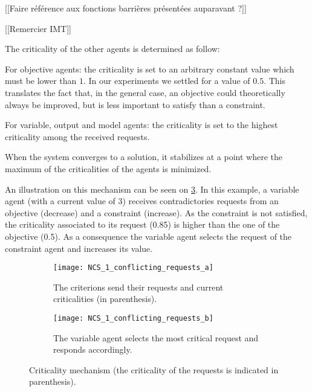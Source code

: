 [[Faire référence aux fonctions barrières présentées auparavant ?]]

[[Remercier IMT]]

\noindent The criticality of the other agents is determined as follow:

\begin{compactitem}
\item For objective agents: the criticality is set to an arbitrary constant value which must be lower than \(1\). In our experiments we settled for a value of \(0.5\). This translates the fact that, in the general case, an objective could theoretically always be improved, but is less important to satisfy than a constraint.
\item For variable, output and model agents: the criticality is set to the highest criticality among the received requests.
\end{compactitem}

When the system converges to a solution, it stabilizes at a point where the maximum of the criticalities of the agents is minimized.

An illustration on this mechanism can be seen on \figurename{} \ref{NCS_1_conflicting_requests}. In this example, a variable agent (with a current value of 3) receives contradictories requests from an objective (decrease) and a constraint (increase). As the constraint is not satisfied, the criticality associated to its request (0.85) is higher than the one of the objective (0.5). As a consequence the variable agent selects the request of the constraint agent and increases its value.

\begin{figure}
	\centering
	\begin{subfigure}[b]{0.45\textwidth}
		\centering
		\texttt{[image: NCS\_1\_conflicting\_requests\_a]}
		\caption{The criterions send their requests and current criticalities (in parenthesis).}\label{NCS_1_conflicting_requests_a}
	\end{subfigure}
	\hfill
	\begin{subfigure}[b]{0.45\textwidth}
		\centering
		\texttt{[image: NCS\_1\_conflicting\_requests\_b]}
		\caption{The variable agent selects the most critical request and responds accordingly.}\label{NCS_1_conflicting_requests_b}
	\end{subfigure}
	
\caption{Criticality mechanism (the criticality of the requests is indicated in parenthesis).}\label{NCS_1_conflicting_requests}
\end{figure}


